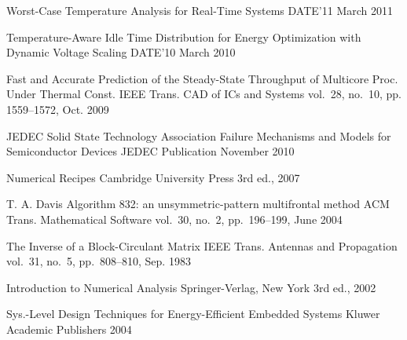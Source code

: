 \begin{thebibliography}{99}
    \publication
      {}
      {Worst-Case Temperature Analysis for Real-Time Systems}
      {DATE'11}
      {March 2011}

    \publication
      {}
      {Temperature-Aware Idle Time Distribution for Energy Optimization with Dynamic Voltage Scaling}
      {DATE'10}
      {March 2010}

    \publication
      {}
      {Fast and Accurate Prediction of the Steady-State Throughput of Multicore Proc. Under Thermal Const.}
      {IEEE Trans. CAD of ICs and Systems}
      {vol.~28, no.~10, pp. 1559--1572, Oct. 2009}

    \publication
      {JEDEC Solid State Technology Association}
      {Failure Mechanisms and Models for Semiconductor Devices}
      {JEDEC Publication}
      {November 2010}


    \publication
      {}
      {Numerical Recipes}
      {Cambridge University Press}
      {3rd ed., 2007}

    \publication
      {T. A. Davis}
      {Algorithm 832: an unsymmetric-pattern multifrontal method}
      {ACM Trans. Mathematical Software}
      {vol.~30, no.~2, pp.~196--199, June 2004}

    \publication
      {}
      {The Inverse of a Block-Circulant Matrix}
      {IEEE Trans. Antennas and Propagation}
      {vol.~31, no.~5, pp.~808--810, Sep. 1983}


    \publication
      {}
      {Introduction to Numerical Analysis}
      {Springer-Verlag, New York}
      {3rd ed., 2002}

    \publication
      {}
      {Sys.-Level Design Techniques for Energy-Efficient Embedded Systems}
      {Kluwer Academic Publishers}
      {2004}


\end{thebibliography}
